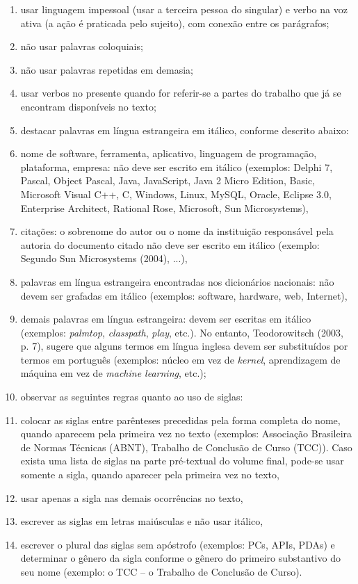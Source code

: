 \begin{enumerate}
\def\labelenumi{\alph{enumi})}
\item
  usar linguagem impessoal (usar a terceira pessoa do singular) e verbo
  na voz ativa (a ação é praticada pelo sujeito), com conexão entre os
  parágrafos;
\item
  não usar palavras coloquiais;
\item
  não usar palavras repetidas em demasia;
\item
  usar verbos no presente quando for referir-se a partes do trabalho que
  já se encontram disponíveis no texto;
\item
  destacar palavras em língua estrangeira em itálico, conforme descrito
  abaixo:
\item
  nome de software, ferramenta, aplicativo, linguagem de programação,
  plataforma, empresa: não deve ser escrito em itálico (exemplos: Delphi
  7, Pascal, Object Pascal, Java, JavaScript, Java 2 Micro Edition,
  Basic, Microsoft Visual C++, C, Windows, Linux, MySQL, Oracle, Eclipse
  3.0, Enterprise Architect, Rational Rose, Microsoft, Sun
  Microsystems),
\item
  citações: o sobrenome do autor ou o nome da instituição responsável
  pela autoria do documento citado não deve ser escrito em itálico
  (exemplo: Segundo Sun Microsystems (2004), ...),
\item
  palavras em língua estrangeira encontradas nos dicionários nacionais:
  não devem ser grafadas em itálico (exemplos: software, hardware, web,
  Internet),
\item
  demais palavras em língua estrangeira: devem ser escritas em itálico
  (exemplos: \emph{palmtop}, \emph{classpath}, \emph{play}, etc.). No
  entanto, Teodorowitsch (2003, p. 7), sugere que alguns termos em
  língua inglesa devem ser substituídos por termos em português
  (exemplos: núcleo em vez de \emph{kernel}, aprendizagem de máquina em
  vez de \emph{machine learning}, etc.);
\item
  observar as seguintes regras quanto ao uso de siglas:
\item
  colocar as siglas entre parênteses precedidas pela forma completa do
  nome, quando aparecem pela primeira vez no texto (exemplos: Associação
  Brasileira de Normas Técnicas (ABNT), Trabalho de Conclusão de Curso
  (TCC)). Caso exista uma lista de siglas na parte pré-textual do volume
  final, pode-se usar somente a sigla, quando aparecer pela primeira vez
  no texto,
\item
  usar apenas a sigla nas demais ocorrências no texto,
\item
  escrever as siglas em letras maiúsculas e não usar itálico,
\item
  escrever o plural das siglas sem apóstrofo (exemplos: PCs, APIs, PDAs)
  e determinar o gênero da sigla conforme o gênero do primeiro
  substantivo do seu nome (exemplo: o TCC -- o Trabalho de Conclusão de
  Curso).
\end{enumerate}


